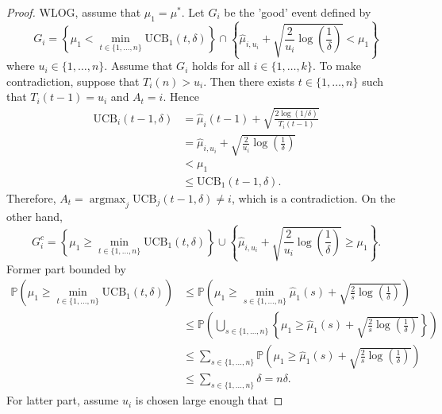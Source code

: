 \documentclass[10pt]{article}
\theoremstyle{definition}
\DeclareMathOperator*{\argmax}{argmax}
\begin{document}
\begin{proof}
    WLOG, assume that $\mu_1 = \mu^*$. Let $G_i$ be the 'good' event defined by
    \begin{equation*}
        G_i = \left\{ \mu_1 < \min\limits_{t \in \{1, \ldots, n\}} \mathrm{UCB}_1(t, \delta) \right\} \cap \left\{ \hat{\mu}_{i, u_i} + \sqrt{\frac{2}{u_i}\log\left(\frac{1}{\delta}\right)} < \mu_1 \right\}
    \end{equation*}
    where $u_i \in \{1, \ldots, n\}$.
    Assume that $G_i$ holds for all $i \in \{1, \ldots, k\}$.
    To make contradiction, suppose that $T_i (n) > u_i$.
    Then there exists $t \in \{1, \ldots, n\}$ such that $T_i(t-1) = u_i$ and $A_t = i$.
    Hence
    \begin{align*}
        \mathrm{UCB}_i(t-1, \delta) &= \hat{\mu}_i (t-1) + \sqrt{\frac{2 \log(1/\delta)}{T_i(t-1)}} \\
        &= \hat{\mu}_{i, u_i} + \sqrt{\frac{2}{u_i}\log\left(\frac{1}{\delta}\right)} \\
        &< \mu_1 \\
        &\leq \mathrm{UCB}_1(t-1, \delta).
    \end{align*}
    Therefore, $A_t = \argmax_j \mathrm{UCB}_j(t-1, \delta) \neq i$, which is a contradiction.
    On the other hand,
    \begin{equation*}
        G_i^c = \left\{ \mu_1 \geq \min\limits_{t \in \{1, \ldots, n\}} \mathrm{UCB}_1(t, \delta) \right\} \cup \left\{ \hat{\mu}_{i, u_i} + \sqrt{\frac{2}{u_i}\log\left(\frac{1}{\delta}\right)} \geq \mu_1 \right\}.
    \end{equation*}
    Former part bounded by
    \begin{align*}
        \mathbb{P}\left( \mu_1 \geq \min\limits_{t \in \{1, \ldots, n\}} \mathrm{UCB}_1(t, \delta) \right) 
        &\leq \mathbb{P}\left(\mu_1 \geq \min_{s \in \{1, \ldots, n\}} \hat{\mu}_1(s) + \sqrt{\frac{2}{s}\log\left(\frac{1}{\delta}\right)} \right) \\
        &\leq \mathbb{P}\left( \bigcup_{s \in \{1, \ldots ,n \}} \left\{\mu_1 \geq \hat{\mu}_1(s) + \sqrt{\frac{2}{s}\log\left(\frac{1}{\delta}\right)} \right\} \right) \\
        &\leq \sum_{s \in \{1, \ldots, n\}} \mathbb{P}\left( \mu_1 \geq \hat{\mu}_1(s) + \sqrt{\frac{2}{s}\log\left(\frac{1}{\delta}\right)} \right) \\
        &\leq \sum_{s \in \{1, \ldots, n\}} \delta = n \delta.
    \end{align*}
    For latter part, assume $u_i$ is chosen large enough that

\end{proof}
\end{document}
